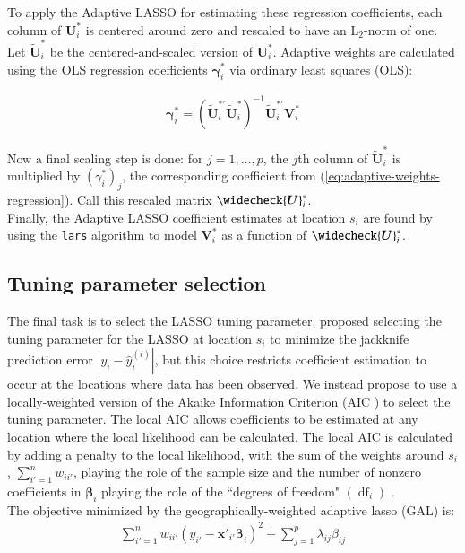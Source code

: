 \documentclass[authoryear, review, 11pt]{elsarticle}
\DeclareMathOperator*{\df}{\mbox{df}}
\begin{document}
	To apply the Adaptive LASSO for estimating these regression coefficients, each column of $\bm{U}_i^*$ is centered around zero and rescaled to have an $\mbox{L}_2$-norm of one. Let $\widetilde{\bm{U}}_i^*$ be the centered-and-scaled version of $\bm{U}_i^*$. Adaptive weights are calculated using the OLS regression coefficients $\bm{\gamma}_i^*$ via ordinary least squares (OLS):
	
	\begin{eqnarray}\label{eq:adaptive-weights-regression}
		\bm{\gamma}_i^* = \left( \widetilde{\bm{U}}_i^{*'} \widetilde{\bm{U}}_i^* \right)^{-1} \widetilde{\bm{U}}_i^{*'} \bm{V}_i^*
	\end{eqnarray}
	
	Now a final scaling step is done: for $j=1, \dots, p$, the $j$th column of $\tilde{\bm{U}}_i^*$ is multiplied by $\left(\gamma_i^*\right)_j$, the corresponding coefficient from (\ref{eq:adaptive-weights-regression}). Call this rescaled matrix $\widecheck{\bm{U}}_i^*$.\\
	
	Finally, the Adaptive LASSO coefficient estimates at location $s_i$ are found by using the \verb!lars! algorithm \citep{Efron:2004b} to model $\bm{V}_i^*$ as a function of $\widecheck{\bm{U}}_i^*$.

	\subsection{Tuning parameter selection}
	The final task is to select the LASSO tuning parameter. \cite{Wheeler:2009} proposed selecting the tuning parameter for the LASSO at location $s_i$ to minimize the jackknife prediction error $|y_i - \hat{y}_i^{(i)}|$, but this choice restricts coefficient estimation to occur at the locations where data has been observed. We instead propose to use a locally-weighted version of the Akaike Information Criterion (AIC \citep{Akaike:1974}) to select the tuning parameter. The local AIC allows coefficients to be estimated at any location where the local likelihood can be calculated. The local AIC is calculated by adding a penalty to the local likelihood, with the sum of the weights around $s_i$, $\sum_{i'=1}^n w_{ii'}$, playing the role of the sample size and the number of nonzero coefficients in $\bm{\beta}_i$ playing the role of the ``degrees of freedom" $\left( \df_i \right)$ \citep{Zou:2007}.\\
	
	The objective minimized by the geographically-weighted adaptive lasso (GAL) is:	
	\begin{eqnarray}
		\sum_{i'=1}^n w_{ii'} \left(y_{i'} - \bm{x}'_{i'} \bm{\beta}_i \right)^2 + \sum_{j=1}^p \lambda_{ij} \beta_{ij}
	\end{eqnarray}
	
\end{document}
